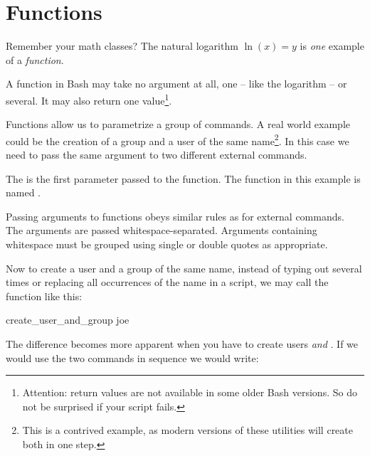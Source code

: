 \documentclass{olli-handout}
\begin{document}
\section{Functions}

\begin{refmanbash}
\end{refmanbash}

Remember your math classes? The natural logarithm $\ln(x) = y$ is \emph{one} example of a \emph{function}.

A function in Bash may take no argument at all, one -- like the logarithm -- or several. It may also return one value\footnote{Attention: return values are not available in some older Bash versions. So do not be surprised if your script fails.}.

Functions allow us to parametrize a group of commands. A real world example could be the creation of a group and a user of the same name\footnote{This is a contrived example, as modern versions of these utilities will create both in one step.}. In this case we need to pass the same argument to two different external commands.


The  is the first parameter passed to the function. The function in this example is named .

\begin{hintbox}
    {\olliPenR} Passing arguments to functions obeys similar rules as for external commands. The arguments are passed whitespace-separated. Arguments containing whitespace must be grouped using single or double quotes as appropriate.
\end{hintbox}

Now to create a user  and a group of the same name, instead of typing out  several times or replacing all occurrences of the name in a script, we may call the function like this:

\begin{lstbash}
create_user_and_group joe
\end{lstbash}

The difference becomes more apparent when you have to create users  \emph{and} . If we would use the two commands in sequence we would write:
\end{document}
